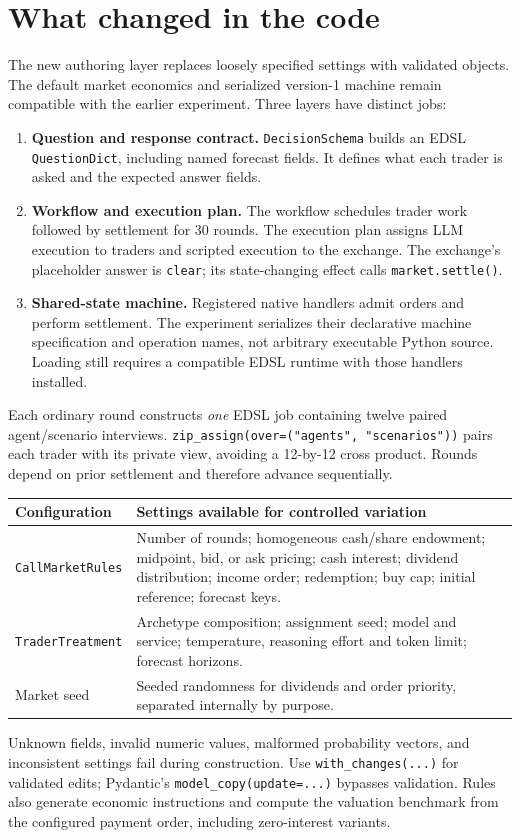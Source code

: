 \documentclass[11pt,letterpaper]{article}
\begin{document}
\clearpage
\section{What changed in the code}
The new authoring layer replaces loosely specified settings with validated
objects. The default market economics and serialized version-1 machine
remain compatible with the earlier experiment. Three layers have distinct jobs:
\begin{enumerate}
\item \textbf{Question and response contract.} \texttt{DecisionSchema} builds
an EDSL \texttt{QuestionDict}, including named forecast fields. It defines
what each trader is asked and the expected answer fields.
\item \textbf{Workflow and execution plan.} The workflow schedules trader
work followed by settlement for 30 rounds. The execution plan assigns LLM
execution to traders and scripted execution to the exchange. The exchange's
placeholder answer is \texttt{clear}; its state-changing effect calls
\texttt{market.settle()}.
\item \textbf{Shared-state machine.} Registered native handlers admit orders
and perform settlement. The experiment serializes their declarative machine
specification and operation names, not arbitrary executable Python source.
Loading still requires a compatible EDSL runtime with those handlers installed.
\end{enumerate}
Each ordinary round constructs \emph{one} EDSL job containing twelve paired
agent/scenario interviews. \texttt{zip\_assign(over=("agents", "scenarios"))}
pairs each trader with its private view, avoiding a 12-by-12 cross product.
Rounds depend on prior settlement and therefore advance sequentially.

\begin{center}\small
\begin{tabularx}{\linewidth}{@{}lX@{}}\toprule
Configuration & Settings available for controlled variation\\\midrule
\texttt{CallMarketRules} & Number of rounds; homogeneous cash/share endowment;
midpoint, bid, or ask pricing; cash interest; dividend distribution; income
order; redemption; buy cap; initial reference; forecast keys.\\
\texttt{TraderTreatment} & Archetype composition; assignment seed; model and
service; temperature, reasoning effort and token limit; forecast horizons.\\
Market seed & Seeded randomness for dividends and order priority, separated
internally by purpose.\\\bottomrule
\end{tabularx}
\end{center}
Unknown fields, invalid numeric values, malformed probability vectors, and
inconsistent settings fail during construction. Use \texttt{with\_changes(...)}
for validated edits; Pydantic's \texttt{model\_copy(update=...)} bypasses
validation. Rules also generate economic instructions and compute the valuation
benchmark from the configured payment order, including zero-interest variants.
\end{document}
